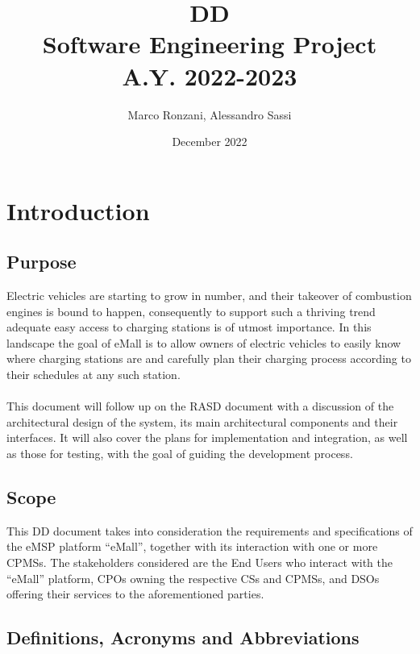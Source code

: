\documentclass[11pt]{article}
\title{%
  \textbf{DD} \\
  \large Software Engineering Project \\ A.Y. 2022-2023}
\author{Marco Ronzani, Alessandro Sassi}
\date{December 2022}
\begin{document}
\maketitle

\doublespacing
\tableofcontents
\singlespacing

\newpage

\section{Introduction}
\label{section:introduction}

\subsection{Purpose}

Electric vehicles are starting to grow in number, and their takeover of combustion engines is bound to happen, consequently to support such a thriving trend adequate easy access to charging stations is of utmost importance. In this landscape the goal of eMall is to allow owners of electric vehicles to easily know where charging stations are and carefully plan their charging process according to their schedules at any such station. \\
\\
This document will follow up on the RASD document with a discussion of the architectural design of the system, its main architectural components and their interfaces. It will also cover the plans for implementation and integration, as well as those for testing, with the goal of guiding the development process. \\

\subsection{Scope}

This DD document takes into consideration the requirements and specifications of the eMSP platform “eMall”, together with its interaction with one or more CPMSs. The stakeholders considered are the End Users who interact with the “eMall” platform, CPOs owning the respective CSs and CPMSs, and DSOs offering their services to the aforementioned parties.

\subsection{Definitions, Acronyms and Abbreviations}
\end{document}
